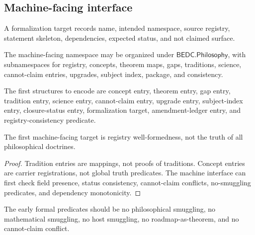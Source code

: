 \subsection{Machine-facing interface}
\label{subsec:philosophy-machine-facing-interface}

\begin{definition}
\label{def:philosophy-formalization-target-interface}
A formalization target records name, intended namespace, source
registry, statement skeleton, dependencies, expected status, and not
claimed surface.
\end{definition}

\begin{definition}
\label{def:philosophy-namespace-draft}
The machine-facing namespace may be organized under
\(\mathsf{BEDC.Philosophy}\), with subnamespaces for registry,
concepts, theorem maps, gaps, traditions, science, cannot-claim
entries, upgrades, subject index, package, and consistency.
\end{definition}

\begin{definition}
\label{def:philosophy-entry-structure-draft}
The first structures to encode are concept entry, theorem entry, gap
entry, tradition entry, science entry, cannot-claim entry, upgrade
entry, subject-index entry, closure-status entry, formalization
target, amendment-ledger entry, and registry-consistency predicate.
\end{definition}

\begin{theorem}
\label{thm:philosophy-first-target-well-formedness}
The first machine-facing target is registry well-formedness, not the
truth of all philosophical doctrines.
\end{theorem}
\begin{proof}
Tradition entries are mappings, not proofs of traditions. Concept
entries are carrier registrations, not global truth predicates. The
machine interface can first check field presence, status consistency,
cannot-claim conflicts, no-smuggling predicates, and dependency
monotonicity.
\end{proof}

\begin{corollary}
\label{cor:philosophy-no-smuggling-predicates-first}
The early formal predicates should be no philosophical smuggling, no
mathematical smuggling, no host smuggling, no roadmap-as-theorem, and
no cannot-claim conflict.
\end{corollary}

